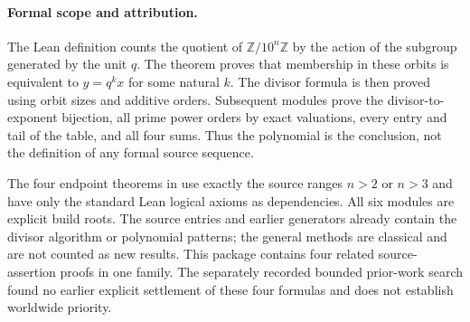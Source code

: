\paragraph{Formal scope and attribution.}
The Lean definition counts the quotient of $\mathbb Z/10^n\mathbb Z$
by the action of the subgroup generated by the unit $q$.
The theorem  proves that membership in these
orbits is equivalent to $y=q^kx$ for some natural $k$.
The divisor formula is then proved using orbit sizes and additive
orders. Subsequent modules prove the divisor-to-exponent bijection,
all prime power orders by exact valuations, every entry and tail of
the table, and all four sums. Thus the polynomial is the conclusion,
not the definition of any formal source sequence.

The four endpoint theorems in  use exactly the
source ranges $n>2$ or $n>3$ and have only the standard Lean logical
axioms as dependencies. All six modules are explicit build roots.
The source entries and earlier generators already contain the
divisor algorithm or polynomial patterns; the general methods are
classical and are not counted as new results. This package contains
four related source-assertion proofs in one family. The separately
recorded bounded prior-work search found no earlier explicit
settlement of these four formulas and does not establish worldwide
priority.
